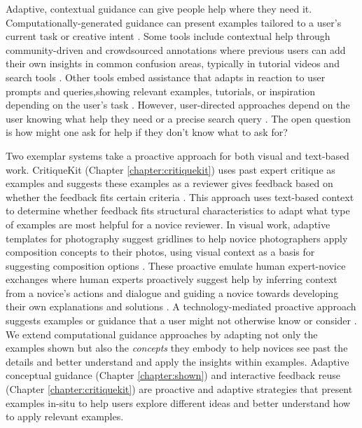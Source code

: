Adaptive, contextual guidance can give people help where they need it. Computationally-generated guidance can present examples tailored to a user's current task or creative intent \cite{fraser2019replay,kandel2011wrangler,kumar2011, Lee2010}. Some tools include contextual help through community-driven and crowdsourced annotations where previous users can add their own insights in common confusion areas, typically in tutorial videos and search tools \cite{chilana2012lemonaid,kim2014data,Kima,matejka2009communitycommands,weir2015learnersourcing}. Other tools embed assistance that adapts in reaction to user prompts and queries,showing relevant examples, tutorials, or inspiration depending on the user’s task \cite{chilana2012lemonaid, fraser2016discovery,fraser2020remap, fraser2019replay, laput2013pixeltone}. However, user-directed approaches depend on the user knowing what help they need or a precise search query \cite{aleven2004toward,aleven2003help, bilalic2008good, Graesser1994, hearst2009search}. The open question is how might one ask for help if they don’t know what to ask for? 

Two exemplar systems take a proactive approach for both visual and text-based work. CritiqueKit (Chapter \ref{chapter:critiquekit}) uses past expert critique as examples and suggests these examples as a reviewer gives feedback based on whether the feedback fits certain criteria \cite{ngoon2018interactive}. This approach uses text-based context to determine whether feedback fits structural characteristics to adapt what type of examples are most helpful for a novice reviewer. In visual work, adaptive templates for photography suggest gridlines to help novice photographers apply composition concepts to their photos, using visual context as a basis for suggesting composition options \cite{jane2020adaptive}. These proactive emulate human expert-novice exchanges where human experts proactively suggest help by inferring context from a novice’s actions and dialogue and guiding a novice towards developing their own explanations and solutions \cite{Chi1996, Chi2010, Graesser1995, schon1984reflective}. A technology-mediated proactive approach suggests examples or guidance that a user might not otherwise know or consider \cite{grossman2010toolclips, li2011design, matejka2009communitycommands}. We extend computational guidance approaches by adapting not only the examples shown but also the \textit{concepts} they embody to help novices see past the details and better understand and apply the insights within examples. Adaptive conceptual guidance (Chapter \ref{chapter:shown}) and interactive feedback reuse (Chapter \ref{chapter:critiquekit}) are proactive and adaptive strategies that present examples in-situ to help users explore different ideas and better understand how to apply relevant examples.

